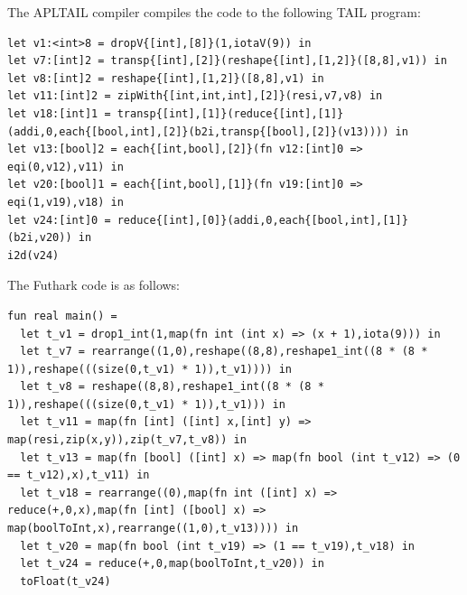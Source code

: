 \documentclass[11pt]{article}
\begin{document}
The APLTAIL compiler compiles the code to the following TAIL program:
\begin{lstlisting}[breaklines=true,language=TAIL]
let v1:<int>8 = dropV{[int],[8]}(1,iotaV(9)) in
let v7:[int]2 = transp{[int],[2]}(reshape{[int],[1,2]}([8,8],v1)) in
let v8:[int]2 = reshape{[int],[1,2]}([8,8],v1) in
let v11:[int]2 = zipWith{[int,int,int],[2]}(resi,v7,v8) in
let v18:[int]1 = transp{[int],[1]}(reduce{[int],[1]}(addi,0,each{[bool,int],[2]}(b2i,transp{[bool],[2]}(v13)))) in
let v13:[bool]2 = each{[int,bool],[2]}(fn v12:[int]0 => eqi(0,v12),v11) in
let v20:[bool]1 = each{[int,bool],[1]}(fn v19:[int]0 => eqi(1,v19),v18) in
let v24:[int]0 = reduce{[int],[0]}(addi,0,each{[bool,int],[1]}(b2i,v20)) in
i2d(v24)
\end{lstlisting}

The Futhark code is as follows:
\begin{lstlisting}[language=Futhark,breaklines=true]
fun real main() =
  let t_v1 = drop1_int(1,map(fn int (int x) => (x + 1),iota(9))) in
  let t_v7 = rearrange((1,0),reshape((8,8),reshape1_int((8 * (8 * 1)),reshape(((size(0,t_v1) * 1)),t_v1)))) in
  let t_v8 = reshape((8,8),reshape1_int((8 * (8 * 1)),reshape(((size(0,t_v1) * 1)),t_v1))) in
  let t_v11 = map(fn [int] ([int] x,[int] y) => map(resi,zip(x,y)),zip(t_v7,t_v8)) in
  let t_v13 = map(fn [bool] ([int] x) => map(fn bool (int t_v12) => (0 == t_v12),x),t_v11) in
  let t_v18 = rearrange((0),map(fn int ([int] x) => reduce(+,0,x),map(fn [int] ([bool] x) => map(boolToInt,x),rearrange((1,0),t_v13)))) in
  let t_v20 = map(fn bool (int t_v19) => (1 == t_v19),t_v18) in
  let t_v24 = reduce(+,0,map(boolToInt,t_v20)) in
  toFloat(t_v24)
\end{lstlisting}
\end{document}
